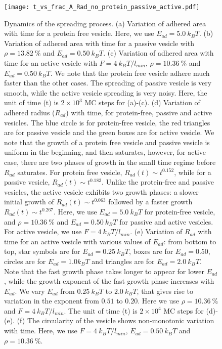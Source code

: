 \documentclass[pre,amsmath]{revtex4}
\begin{document}
\begin{figure}[ht]
\centering
\texttt{[image: t\_vs\_frac\_A\_Rad\_no\_protein\_passive\_active.pdf]}
\caption{Dynamics of the spreading process. (a) Variation of adhered area with time for a protein free vesicle. Here, we use $E_{ad}=5.0 ~k_B T$. (b) Variation of adhered area with time for a passive vesicle with $\rho=13.82 ~\%$ and $E_{ad}=0.50 ~k_B T$. (c)  Variation of adhered area with time for an active vesicle with $F=4 ~k_B T/l_{min}$, $\rho=10.36~\%$ and $E_{ad}=0.50~ k_B T$. We note that the protein free vesicle adhere much faster than the other cases. The spreading of passive vesicle is very smooth, while the active vesicle spreading is very noisy. Here, the unit of time (t) is $2 \times 10^3$ MC steps for (a)-(c). (d) Variation of adhered radius ($R_{ad}$) with time, for protein-free, passive and active vesicles. The blue circle is for protein-free vesicle, the red triangles are for passive vesicle and the green boxes are for active vesicle. We note that the growth of a protein free vesicle and passive vesicle is uniform in the beginning, and then saturates, however, for active case, there are two phases of growth in the small time regime before $R_{ad}$ saturates. For protein free vesicle, $R_{ad}(t) \sim t^{0.152}$, while for a passive vesicle, $R_{ad}(t) \sim t^{0.183}$. Unlike the protein-free and passive vesicles, the active vesicle exhibits two growth phases: a slower initial growth of  $R_{ad}(t) \sim t^{0.063}$ followed by a faster growth $R_{ad}(t) \sim t^{0.267}$. Here, we use $E_{ad}=5.0 ~k_B T$ for protein-free vesicle, and $\rho=10.36 ~\%$ and $E_{ad}=0.50 ~k_B T$ for passive and active vesicles. For active vesicle, we use $F=4 ~k_B T/l_{min}$. (e) Variation of $R_{ad}$ with time for an active vesicle with various values of $E_{ad}$: from bottom to top, star symbols are for $E_{ad}=0.25 ~k_B T$, boxes are for $E_{ad}=0.50$, circles are for $E_{ad}=1.0 k_B T$ and triangles are for $E_{ad}=2.0 ~k_B T$. Note that the fast growth phase takes longer to appear for lower $E_{ad}$, while the growth exponent of the fast growth phase increases with $E_{ad}$. We vary $E_{ad}$ from $0.25 ~k_B T$ to $2.0~ k_B T$, that gives rise to variation in the exponent from $0.51$ to $0.20$. Here we use $\rho=10.36 ~\%$ and $F=4~ k_B T/l_{min}$. The unit of time (t) is $2 \times 10^4$ MC steps for (d)-(e). (f) The circularity of the vesicle shows non-monotonic variation with time. Here, we use $F=4  ~k_B T/l_{min}$, $E_{ad}=0.50 ~k_B T$ and $\rho=10.36 ~\%$.}
\label{t_vs_A} 
\end{figure}
\end{document}
